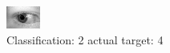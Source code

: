 \begin{figure}[h!]
\begin{center}
\includegraphics[width=0.60\columnwidth]{figures/ID851_class_2_target_4.png}
\end{center}
\caption{ Classification: 2 actual target: 4}
\label{fig:ID851_class_2_target_4}
\end{figure}
